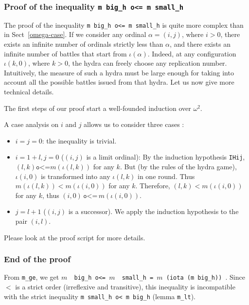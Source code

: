 \subsubsection{Proof of the inequality \texttt{m big\_h o<= m small\_h} }


The proof of the inequality \texttt{m big\_h o<= m small\_h} is quite more complex than in Sect~\ref{omega-case}.  If we consider any ordinal $\alpha=(i,j)$, where $i>0$, there exists an infinite number of
ordinals strictly less than $\alpha$, and there exists an infinite number of battles that start from
$\iota(\alpha)$. Indeed, at any configuration $\iota(k,0)$, where $k>0$, the hydra can freely choose any replication number. Intuitively, the measure of such a hydra must be large enough for taking into account
all the possible battles issued from that hydra.
Let us now give more technical details.

The first steps of our proof start a well-founded induction over $\omega^2$.





A case analysis on $i$ and $j$ allows us to
consider three cases :

\begin{itemize}
\item $i=j=0$: the inequality is trivial.
\item $i=1+l, j=0$ ($(i,j)$ is a limit ordinal): By the induction hypothesis \texttt{IHij},
  $(l,k)\texttt{o<=} m(\iota(l,k))$ for any $k$. But (by the rules of the hydra game), $\iota(i,0)$ is transformed into any $\iota(l,k)$ in one round. Thus $m(\iota(l,k)) < m(\iota(i,0))$ for any $k$.
  Therefore, $(l,k) <  m(\iota(i,0))$ for any $k$, thus
  $(i,0)\,\texttt{o<=}\,m(\iota(i,0))$.
 \item $j= l+1$  ($(i,j)$ is a successor). We apply the induction hypothesis to the pair $(i,l)$.
 \end{itemize}

 Please look at the proof script for more details.
 
 

\subsubsection{End of the proof}
From \texttt{m\_ge}, we get \texttt{$m$\, big\_h o<= $m$\, small\_h = $m$\,(iota (m big\_h)) }. 
Since $<$ is a strict order (irreflexive  and transitive), this inequality is incompatible with the strict inequality  \texttt{m small\_h o< m big\_h} (lemma \texttt{m\_lt}).


